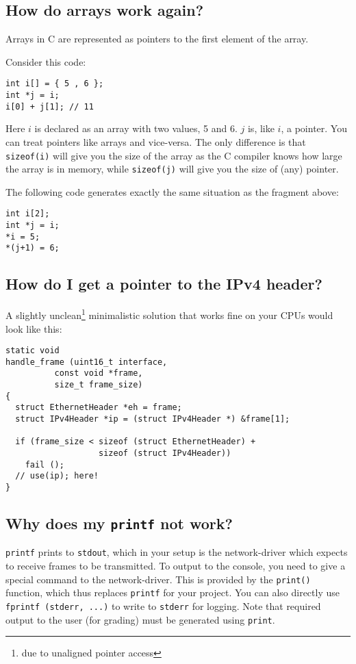 \documentclass{article}
\begin{document}
\subsection{How do arrays work again?}

Arrays in C are represented as pointers to the first element of the
array.

Consider this code:
\begin{verbatim}
int i[] = { 5 , 6 };
int *j = i;
i[0] + j[1]; // 11
\end{verbatim}
Here $i$ is declared as an array with two values, 5 and 6.  $j$ is,
like $i$, a pointer.  You can treat pointers like arrays and vice-versa.
The only difference is that {\tt sizeof(i)} will give you the size of
the array as the C compiler knows how large the array is in memory, while
{\tt sizeof(j)} will give you the size of (any) pointer.

The following code generates exactly the same situation as the fragment
above:
\begin{verbatim}
int i[2];
int *j = i;
*i = 5;
*(j+1) = 6;
\end{verbatim}


\subsection{How do I get a pointer to the IPv4 header?}


A slightly unclean\footnote{due to unaligned pointer access}
minimalistic solution that works fine on your CPUs would look like
this:
\begin{verbatim}
static void
handle_frame (uint16_t interface,
	      const void *frame,
	      size_t frame_size)
{
  struct EthernetHeader *eh = frame;
  struct IPv4Header *ip = (struct IPv4Header *) &frame[1];

  if (frame_size < sizeof (struct EthernetHeader) +
                   sizeof (struct IPv4Header))
    fail ();
  // use(ip); here!
}
\end{verbatim}



\subsection{Why does my {\tt printf} not work?}

{\tt printf} prints to {\tt stdout}, which in your setup is the
network-driver which expects to receive frames to be transmitted.
To output to the console, you need to give a special command to
the network-driver.  This is provided by the {\tt print()} function,
which thus replaces {\tt printf} for your project.  You can
also directly use {\tt fprintf (stderr, ...)} to write to {\tt stderr}
for logging. Note that required output to the user (for grading) must
be generated using {\tt print}.
\end{document}
